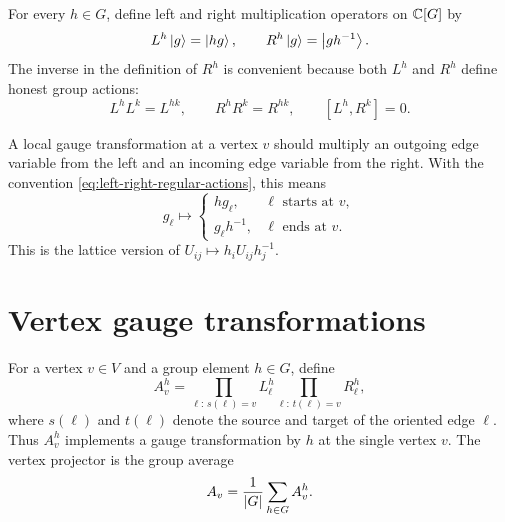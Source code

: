 For every \(h\in G\), define left and right multiplication operators on
\(\mathbb{C}[G]\) by
\begin{equation}
\label{eq:left-right-regular-actions}
    L^h\left|g\right\rangle=\left|hg\right\rangle,
    \qquad
    R^h\left|g\right\rangle=\left|g h^{-1}\right\rangle .
\end{equation}
The inverse in the definition of \(R^h\) is convenient because both \(L^h\) and
\(R^h\) define honest group actions:
\begin{equation}
\label{eq:left-right-group-actions}
    L^hL^k=L^{hk},
    \qquad
    R^hR^k=R^{hk},
    \qquad
    [L^h,R^k]=0 .
\end{equation}

\begin{remark}
A local gauge transformation at a vertex \(v\) should multiply an outgoing edge
variable from the left and an incoming edge variable from the right.  With the
convention \cref{eq:left-right-regular-actions}, this means
\begin{equation}
\label{eq:gauge-transform-edge-variable}
    g_{\ell}\longmapsto
    \begin{cases}
        h g_{\ell}, & \ell\text{ starts at }v,\\
        g_{\ell}h^{-1}, & \ell\text{ ends at }v.
    \end{cases}
\end{equation}
This is the lattice version of \(U_{ij}\mapsto h_iU_{ij}h_j^{-1}\).
\end{remark}

\section{Vertex gauge transformations}
\label{sec:quantum-double-vertex-operators}

For a vertex \(v\in V\) and a group element \(h\in G\), define
\begin{equation}
\label{eq:vertex-gauge-transformation}
    A_v^h
    =
    \prod_{\ell:\,s(\ell)=v} L_{\ell}^{h}
    \prod_{\ell:\,t(\ell)=v} R_{\ell}^{h},
\end{equation}
where \(s(\ell)\) and \(t(\ell)\) denote the source and target of the oriented
edge \(\ell\).  Thus \(A_v^h\) implements a gauge transformation by \(h\) at the
single vertex \(v\).  The vertex projector is the group average
\begin{equation}
\label{eq:quantum-double-vertex-projector}
    A_v=\frac{1}{\left|G\right|}\sum_{h\in G}A_v^h .
\end{equation}

